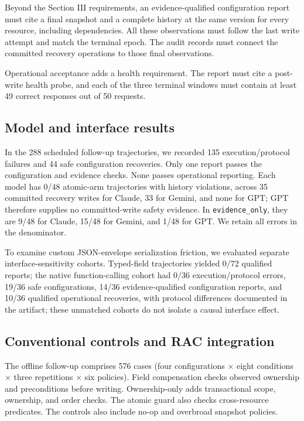 \documentclass[conference,10pt]{IEEEtran}
\begin{document}
Beyond the Section III requirements, an evidence\hyp{}qualified configuration report must cite a final snapshot and a complete history at the same version for every resource, including dependencies. All these observations must follow the last write attempt and match the terminal epoch. The audit records must connect the committed recovery operations to those final observations.

Operational acceptance adds a health requirement. The report must cite a post\hyp{}write health probe, and each of the three terminal windows must contain at least 49 correct responses out of 50 requests.

\subsection{Model and interface results}

In the 288 scheduled follow\hyp{}up trajectories, we recorded 135 execution/protocol failures and 44 safe configuration recoveries. Only one report passes the configuration and evidence checks. None passes operational reporting. Each model has 0/48 atomic\hyp{}arm trajectories with history violations, across 35 committed recovery writes for Claude, 33 for Gemini, and none for GPT; GPT therefore supplies no committed\hyp{}write safety evidence. In \texttt{\mbox{evidence\_}\discretionary{}{}{}\mbox{only}}, they are 9/48 for Claude, 15/48 for Gemini, and 1/48 for GPT. We retain all errors in the denominator.

To examine custom JSON\hyp{}envelope serialization friction, we evaluated separate interface\hyp{}sensitivity cohorts. Typed\hyp{}field trajectories yielded 0/72 qualified reports; the native function\hyp{}calling cohort had 0/36 execution/protocol errors, 19/36 safe configurations, 14/36 evidence\hyp{}qualified configuration reports, and 10/36 qualified operational recoveries, with protocol differences documented in the artifact; these unmatched cohorts do not isolate a causal interface effect.

\subsection{Conventional controls and RAC integration}

The offline follow\hyp{}up comprises 576 cases (four configurations $\times$ eight conditions $\times$ three repetitions $\times$ six policies). Field compensation checks observed ownership and preconditions before writing. Ownership\hyp{}only adds transactional scope, ownership, and order checks. The atomic guard also checks cross\hyp{}resource predicates. The controls also include no\hyp{}op and overbroad snapshot policies.
\end{document}
